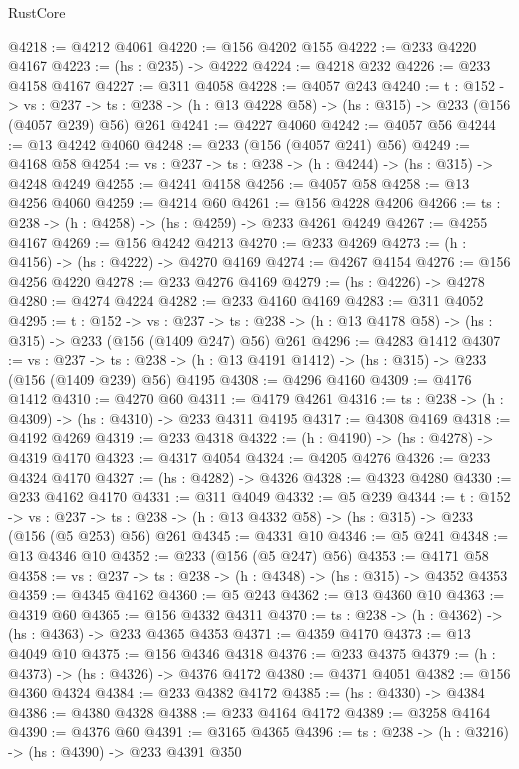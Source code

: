 \begin{lexlean}{RustCore}
\begin{coremodule}
@4218 := @4212 @4061
@4220 := @156 @4202 @155
@4222 := @233 @4220 @4167
@4223 := (hs : @235) -> @4222
@4224 := @4218 @232
@4226 := @233 @4158 @4167
@4227 := @311 @4058
@4228 := @4057 @243
@4240 := {t : @152} ->
  {vs : @237} ->
  {ts : @238} -> (h : @13 @4228 @58) -> (hs : @315) -> @233 (@156 (@4057 @239) @56) @261
@4241 := @4227 @4060
@4242 := @4057 @56
@4244 := @13 @4242 @4060
@4248 := @233 (@156 (@4057 @241) @56)
@4249 := @4168 @58
@4254 := {vs : @237} -> {ts : @238} -> (h : @4244) -> (hs : @315) -> @4248 @4249
@4255 := @4241 @4158
@4256 := @4057 @58
@4258 := @13 @4256 @4060
@4259 := @4214 @60
@4261 := @156 @4228 @4206
@4266 := {ts : @238} -> (h : @4258) -> (hs : @4259) -> @233 @4261 @4249
@4267 := @4255 @4167
@4269 := @156 @4242 @4213
@4270 := @233 @4269
@4273 := (h : @4156) -> (hs : @4222) -> @4270 @4169
@4274 := @4267 @4154
@4276 := @156 @4256 @4220
@4278 := @233 @4276 @4169
@4279 := (hs : @4226) -> @4278
@4280 := @4274 @4224
@4282 := @233 @4160 @4169
@4283 := @311 @4052
@4295 := {t : @152} ->
  {vs : @237} ->
  {ts : @238} -> (h : @13 @4178 @58) -> (hs : @315) -> @233 (@156 (@1409 @247) @56) @261
@4296 := @4283 @1412
@4307 := {vs : @237} ->
  {ts : @238} -> (h : @13 @4191 @1412) -> (hs : @315) -> @233 (@156 (@1409 @239) @56) @4195
@4308 := @4296 @4160
@4309 := @4176 @1412
@4310 := @4270 @60
@4311 := @4179 @4261
@4316 := {ts : @238} -> (h : @4309) -> (hs : @4310) -> @233 @4311 @4195
@4317 := @4308 @4169
@4318 := @4192 @4269
@4319 := @233 @4318
@4322 := (h : @4190) -> (hs : @4278) -> @4319 @4170
@4323 := @4317 @4054
@4324 := @4205 @4276
@4326 := @233 @4324 @4170
@4327 := (hs : @4282) -> @4326
@4328 := @4323 @4280
@4330 := @233 @4162 @4170
@4331 := @311 @4049
@4332 := @5 @239
@4344 := {t : @152} ->
  {vs : @237} -> {ts : @238} -> (h : @13 @4332 @58) -> (hs : @315) -> @233 (@156 (@5 @253) @56) @261
@4345 := @4331 @10
@4346 := @5 @241
@4348 := @13 @4346 @10
@4352 := @233 (@156 (@5 @247) @56)
@4353 := @4171 @58
@4358 := {vs : @237} -> {ts : @238} -> (h : @4348) -> (hs : @315) -> @4352 @4353
@4359 := @4345 @4162
@4360 := @5 @243
@4362 := @13 @4360 @10
@4363 := @4319 @60
@4365 := @156 @4332 @4311
@4370 := {ts : @238} -> (h : @4362) -> (hs : @4363) -> @233 @4365 @4353
@4371 := @4359 @4170
@4373 := @13 @4049 @10
@4375 := @156 @4346 @4318
@4376 := @233 @4375
@4379 := (h : @4373) -> (hs : @4326) -> @4376 @4172
@4380 := @4371 @4051
@4382 := @156 @4360 @4324
@4384 := @233 @4382 @4172
@4385 := (hs : @4330) -> @4384
@4386 := @4380 @4328
@4388 := @233 @4164 @4172
@4389 := @3258 @4164
@4390 := @4376 @60
@4391 := @3165 @4365
@4396 := {ts : @238} -> (h : @3216) -> (hs : @4390) -> @233 @4391 @350

\end{coremodule}
\end{lexlean}
